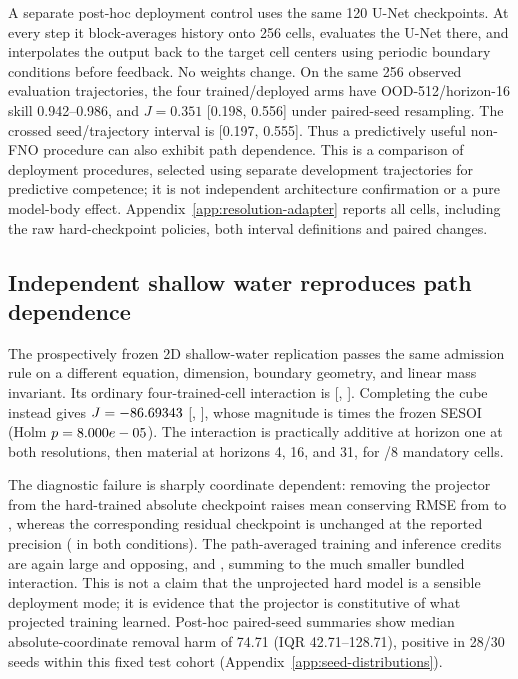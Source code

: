 \documentclass{article}
\begin{document}
A separate post-hoc deployment control uses the same 120 U-Net checkpoints. At every step it
block-averages history onto 256 cells, evaluates the U-Net there, and interpolates
the output back to the target cell centers using periodic boundary conditions before feedback. No weights change. On the same 256
observed evaluation trajectories, the four trained/deployed arms have OOD-512/horizon-16 skill
0.942--0.986, and $J=0.351$ [0.198, 0.556] under paired-seed resampling. The crossed
seed/trajectory interval is [0.197, 0.555]. Thus a predictively useful non-FNO procedure can also
exhibit path dependence. This is a comparison of deployment procedures, selected using separate
development trajectories for predictive competence; it is not independent architecture
confirmation or a pure model-body effect. Appendix~\ref{app:resolution-adapter} reports all cells,
including the raw hard-checkpoint policies, both interval definitions and paired changes.

\subsection{Independent shallow water reproduces path dependence}

The prospectively frozen 2D shallow-water replication passes the same admission rule on a
different equation, dimension, boundary geometry, and linear mass invariant. Its ordinary
four-trained-cell interaction is \SWECoreInteraction{}
[\SWECoreInteractionLow, \SWECoreInteractionHigh]. Completing the cube instead gives
$J=-86.69343$ [\SWEJLow, \SWEJHigh], whose magnitude is \SWEJOverSesoi{} times the frozen SESOI
(Holm $p=8.000e-05$). The interaction is practically additive at horizon one at both resolutions,
then material at horizons 4, 16, and 31, for \SWEMaterialCells/8 mandatory cells.

The diagnostic failure is sharply coordinate dependent: removing the projector from the
hard-trained absolute checkpoint raises mean conserving RMSE from \SWEAOneOne{} to
\SWEAOneZero{}, whereas the corresponding residual checkpoint is unchanged at the reported precision
(\SWEROneOne{} in both conditions). The path-averaged training and inference credits are again large and opposing,
\SWEPhiTrain{} and \SWEPhiInfer{}, summing to the much smaller bundled interaction. This is not a
claim that the unprojected hard model is a sensible deployment mode; it is evidence that the
projector is constitutive of what projected training learned. Post-hoc paired-seed summaries
show median absolute-coordinate removal harm of 74.71 (IQR 42.71--128.71), positive in 28/30
seeds within this fixed test cohort
(Appendix~\ref{app:seed-distributions}).
\end{document}
